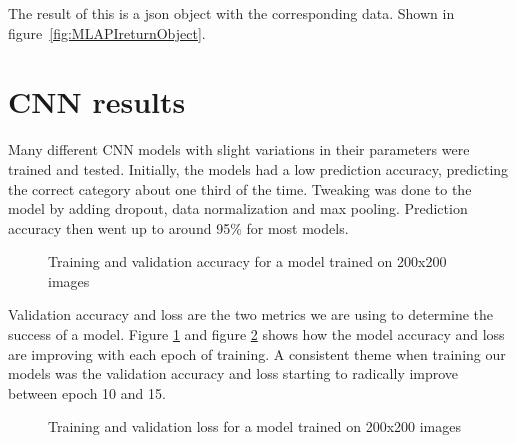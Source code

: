 The result of this is a json object with the corresponding data.
Shown in figure~\ref{fig:MLAPIreturnObject}.

\section{CNN results}\label{sec:cnn-results}
Many different CNN models with slight variations in their parameters were trained and tested.
Initially, the models had a low prediction accuracy, predicting the correct category about one third of the time.
Tweaking was done to the model by adding dropout, data normalization and max pooling.
Prediction accuracy then went up to around 95\% for most models.

\begin{figure}[h]
    \caption{Training and validation accuracy for a model trained on 200x200 images}
    \label{fig:200modelaccuracy}
\end{figure}
\clearpage
Validation accuracy and loss are the two metrics we are using to determine the success of a model.
Figure \ref{fig:200modelaccuracy} and figure \ref{fig:200modelloss} shows how the model accuracy and loss are improving with each epoch of training.
A consistent theme when training our models was the validation accuracy and loss starting to radically improve between epoch 10 and 15.

\begin{figure}[h]
    \caption{Training and validation loss for a model trained on 200x200 images}
    \label{fig:200modelloss}
\end{figure}


